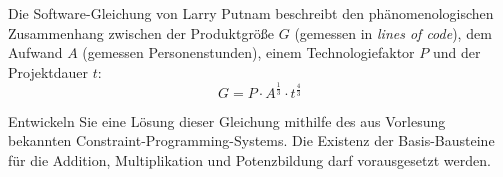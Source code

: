 Die Software-Gleichung von Larry Putnam beschreibt den phänomenologischen Zusammenhang zwischen der Produktgröße $G$ (gemessen in \emph{lines of code}), dem Aufwand $A$ (gemessen Personenstunden), einem Technologiefaktor $P$ und der Projektdauer $t$: 
$$ G = P \cdot A^{\frac{1}{3}} \cdot  t^{\frac{4}{3}}$$ 

Entwickeln Sie eine Lösung dieser Gleichung mithilfe des aus Vorlesung bekannten Constraint-Programming-Systems. Die Existenz der Basis-Bausteine für die Addition, Multiplikation und Potenzbildung darf vorausgesetzt werden.

